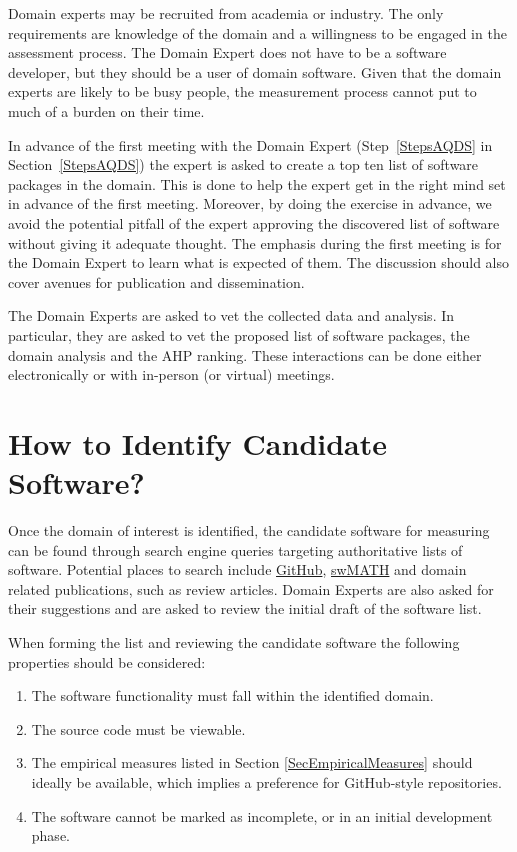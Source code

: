 \documentclass[letterpaper,cleveref]{lipics-v2019}
\begin{document}
Domain experts may be recruited from academia or industry.  The only
requirements are knowledge of the domain and a willingness to be engaged in the
assessment process.  The Domain Expert does not have to be a software developer,
but they should be a user of domain software.  Given that the domain experts are
likely to be busy people, the measurement process cannot put to much of a burden
on their time.

In advance of the first meeting with the Domain Expert (Step~\ref{StepsAQDS} in
Section~\ref{StepsAQDS}) the expert is asked to create a top ten list of
software packages in the domain.  This is done to help the expert get in the
right mind set in advance of the first meeting.  Moreover, by doing the exercise
in advance, we avoid the potential pitfall of the expert approving the
discovered list of software without giving it adequate thought.  The emphasis
during the first meeting is for the Domain Expert to learn what is expected of
them.  The discussion should also cover avenues for publication and
dissemination.

The Domain Experts are asked to vet the collected data and analysis.  In
particular, they are asked to vet the proposed list of software packages, the
domain analysis and the AHP ranking.  These interactions can be done either
electronically or with in-person (or virtual) meetings.  

\section{How to Identify Candidate Software?} \label{SecIdentifyCandSoft}

Once the domain of interest is identified, the candidate software for measuring
can be found through search engine queries targeting authoritative lists of
software.  Potential places to search include \href{https://github.com/}
{GitHub}, \href{https://swmath.org/} {swMATH} and domain related publications,
such as review articles. Domain Experts are also asked for their suggestions and
are asked to review the initial draft of the software list.  

When forming the list and reviewing the candidate software the following
properties should be considered:

\begin{enumerate}
\item The software functionality must fall within the identified domain.
\item The source code must be viewable.
\item The empirical measures listed in Section \ref{SecEmpiricalMeasures} should
  ideally be available, which implies a preference for GitHub-style
  repositories.
\item The software cannot be marked as incomplete, or in an initial development
  phase.
\end{enumerate}
\end{document}
